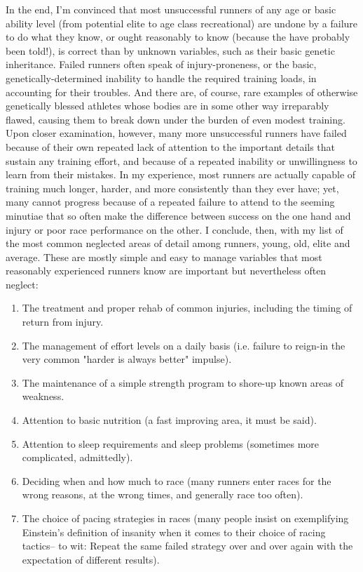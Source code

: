 In the end, I'm convinced that most unsuccessful runners of any age or basic ability level (from potential elite to age class recreational) are undone by a failure to do what they know, or ought reasonably to know (because the have probably been told!), is correct than by unknown variables, such as their basic genetic inheritance. Failed runners often speak of injury-proneness, or the basic, genetically-determined inability to handle the required training loads, in accounting for their troubles. And there are, of course, rare examples of otherwise genetically blessed athletes whose bodies are in some other way irreparably flawed, causing them to break down under the burden of even modest training. Upon closer examination, however, many more unsuccessful runners have failed because of their own repeated lack of attention to the important details that sustain any training effort, and because of a repeated inability or unwillingness to learn from their mistakes. In my experience, most runners are actually capable of training much longer, harder, and more consistently than they ever have; yet, many cannot progress because of a repeated failure to attend to the seeming minutiae that so often make the difference between success on the one hand and injury or poor race performance on the other. I conclude, then, with my list of the most common neglected areas of detail among runners, young, old, elite and average. These are mostly simple and easy to manage variables that most reasonably experienced runners know are important but nevertheless often neglect:


\begin{enumerate}
    \item The treatment and proper rehab of common injuries, including the timing of return from injury.
    \item The management of effort levels on a daily basis (i.e. failure to reign-in the very common "harder is always better" impulse).
    \item The maintenance of a simple strength program to shore-up known areas of weakness.
    \item Attention to basic nutrition (a fast improving area, it must be said).
    \item Attention to sleep requirements and sleep problems (sometimes more complicated, admittedly).
    \item Deciding when and how much to race (many runners enter races for the wrong reasons, at the wrong times, and generally race too often).
    \item The choice of pacing strategies in races (many people insist on exemplifying Einstein's definition of insanity when it comes to their choice of racing tactics-- to wit: Repeat the same failed strategy over and over again with the expectation of different results).
\end{enumerate}
